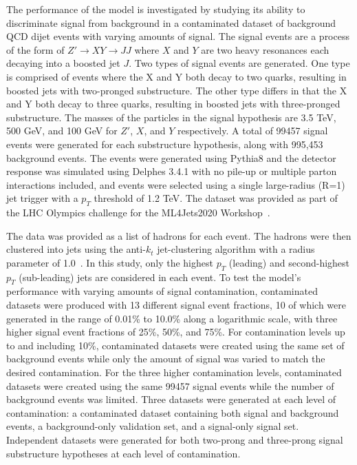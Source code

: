 \documentclass[12pt, a4paper]{article}
\begin{document}
The performance of the model is investigated by studying its ability to discriminate signal from background in a contaminated dataset of background QCD dijet events with varying amounts of signal. The signal events are a process of the form of $Z'\rightarrow XY \rightarrow JJ$ where $X$ and $Y$ are two heavy resonances each decaying into a boosted jet $J$. Two types of signal events are generated. One type is comprised of events where the X and Y both decay to two quarks, resulting in boosted jets with two-pronged substructure. The other type differs in that the X and Y both decay to three quarks, resulting in boosted jets with three-pronged substructure. The masses of the particles in the signal hypothesis are 3.5 TeV, 500 GeV, and 100 GeV for $Z'$, $X$, and $Y$ respectively. A total of 99457 signal events were generated for each substructure hypothesis, along with 995,453 background events. The events were generated using {\sc Pythia8} and the detector response was simulated using {\sc Delphes 3.4.1} with no pile-up or multiple parton interactions included, and events were selected using a single large-radius (R=1) jet trigger with a $p_T$ threshold of 1.2 TeV. The dataset was provided as part of the LHC Olympics challenge for the ML4Jets2020 Workshop~\cite{dataset}. 

The data was provided as a list of hadrons for each event. The hadrons were then clustered into jets using the anti-$k_{t}$ jet-clustering algorithm with a radius parameter of 1.0~\cite{Cacciari_2008}. In this study, only the highest $p_{T}$ (leading) and second-highest $p_{T}$ (sub-leading) jets are considered in each event. To test the model's performance with varying amounts of signal contamination, contaminated datasets were produced with 13 different signal event fractions, 10 of which were generated in the range of 0.01\% to 10.0\% along a logarithmic scale, with three higher signal event fractions of 25\%, 50\%, and 75\%. For contamination levels up to and including 10\%, contaminated datasets were created using the same set of background events while only the amount of signal was varied to match the desired contamination. For the three higher contamination levels, contaminated datasets were created using the same 99457 signal events while the number of background events was limited. Three datasets were generated at each level of contamination: a contaminated dataset containing both signal and background events, a background-only validation set, and a signal-only signal set. Independent datasets were generated for both two-prong and three-prong signal substructure hypotheses at each level of contamination.
\end{document}
